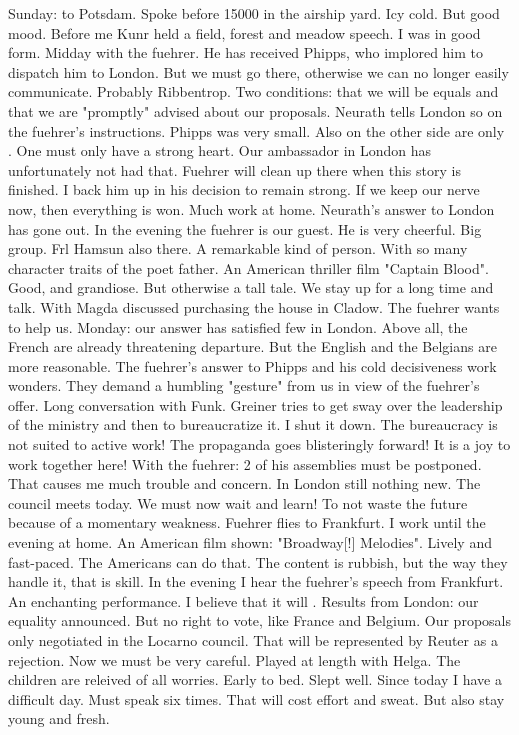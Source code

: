 Sunday: to Potsdam. Spoke before 15000 in the airship yard. Icy cold. But good mood. Before me Kunr held a field, forest and meadow speech. I was in good form. Midday with the fuehrer. He has received Phipps, who implored him to dispatch him to London.  But we must go there, otherwise we can no longer easily communicate. Probably Ribbentrop. Two conditions: that we will be equals and that we are "promptly" advised about our proposals. Neurath tells London so on the fuehrer's instructions. Phipps was very small. Also on the other side are only . One must only have a strong heart. Our ambassador in London has unfortunately not had that. Fuehrer will clean up there when this story is finished. I back him up in his decision to remain strong. If we keep our nerve now, then everything is won. Much work at home. Neurath's answer to London has gone out. In the evening the fuehrer is our guest. He is very cheerful. Big group. Frl Hamsun also there. A remarkable kind of person. With so many character traits of the poet father. An American thriller film "Captain Blood". Good, and grandiose. But otherwise a tall tale. We stay up for a long time and talk. With Magda discussed purchasing the house in Cladow. The fuehrer wants to help us.
Monday: our answer has satisfied few in London. Above all, the French are already threatening departure.  But the English and the Belgians are more reasonable. The fuehrer's answer to Phipps and his cold decisiveness work wonders. They demand a humbling "gesture" from us in view of the fuehrer's offer. Long conversation with Funk. Greiner tries to get sway over the leadership of the ministry and then to bureaucratize it. I shut it down. The bureaucracy is not suited to active work! The propaganda goes blisteringly forward! It is a joy to work together here!
With the fuehrer: 2 of his assemblies must be postponed. That causes me much trouble and concern. In London still nothing new. The council meets today. We must now wait and learn! To not waste the future because of a momentary weakness. Fuehrer flies to Frankfurt. I work until the evening at home. An American film shown: "Broadway[!] Melodies". Lively and fast-paced. The Americans can do that. The content is rubbish, but the way they handle it, that is skill. In the evening I hear the fuehrer's speech from Frankfurt. An enchanting performance. I believe that it will . Results from London: our equality announced. But no right to vote, like France and Belgium. Our proposals only negotiated in the Locarno council. That will be represented by Reuter as a rejection.  Now we must be very careful. Played at length with Helga. The children are releived of all worries. Early to bed. Slept well. Since today I have a difficult day. Must speak six times. That will cost effort and sweat. But also stay young and fresh.


